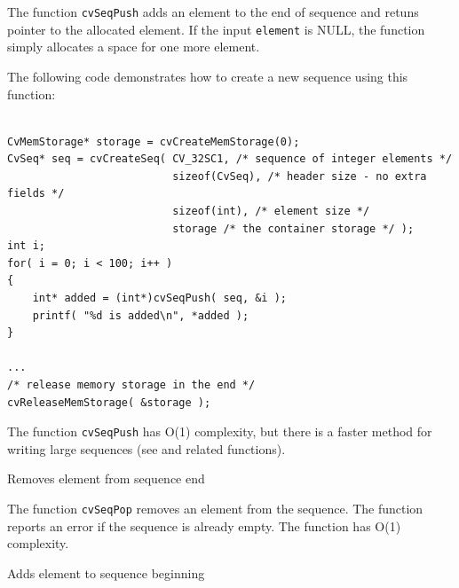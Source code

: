 The function \texttt{cvSeqPush} adds an element to the end of sequence and retuns pointer to the allocated element. If the input \texttt{element} is NULL, the function simply allocates a space for one more element.

The following code demonstrates how to create a new sequence using this function:

\begin{lstlisting}

CvMemStorage* storage = cvCreateMemStorage(0);
CvSeq* seq = cvCreateSeq( CV_32SC1, /* sequence of integer elements */
                          sizeof(CvSeq), /* header size - no extra fields */
                          sizeof(int), /* element size */
                          storage /* the container storage */ );
int i;
for( i = 0; i < 100; i++ )
{
    int* added = (int*)cvSeqPush( seq, &i );
    printf( "%d is added\n", *added );
}

...
/* release memory storage in the end */
cvReleaseMemStorage( &storage );

\end{lstlisting}

The function \texttt{cvSeqPush} has O(1) complexity, but there is a faster method for writing large sequences (see  and related functions).


\label{SeqPop}

Removes element from sequence end


\begin{description}
\end{description}

The function \texttt{cvSeqPop} removes an element from the sequence. The function reports an error if the sequence is already empty. The function has O(1) complexity.

\label{SeqPushFront}

Adds element to sequence beginning



